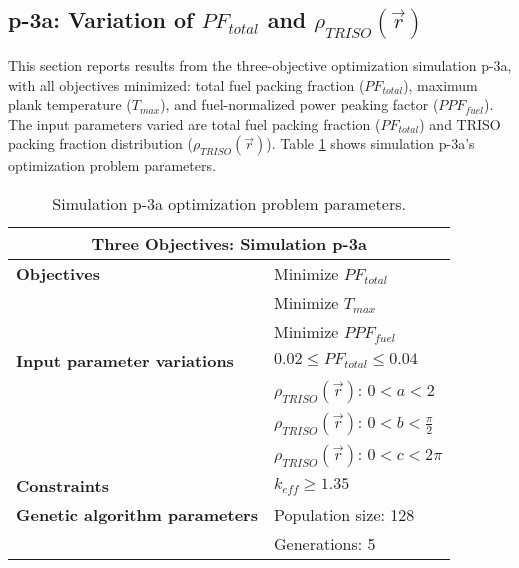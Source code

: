 \subsection{p-3a: Variation of $PF_{total}$ and $\rho_{TRISO}(\vec{r})$}
\label{sec:p-3a}
This section reports results from the three-objective optimization simulation p-3a, 
with all objectives minimized: total fuel packing fraction ($PF_{total}$), 
maximum plank temperature ($T_{max}$), and fuel-normalized power peaking factor 
($PPF_{fuel}$).  
The input parameters varied are total fuel packing fraction ($PF_{total}$) and 
TRISO packing fraction distribution ($\rho_{TRISO}(\vec{r})$). 
Table \ref{tab:simulationp3a} shows simulation p-3a's optimization problem parameters. 
\begin{table}[htbp!]
    \centering
    \onehalfspacing
    \caption{Simulation p-3a optimization problem parameters.}
	\label{tab:simulationp3a}
    \footnotesize
    \begin{tabular}{l|p{4cm}}
    \hline 
    \multicolumn{2}{c}{\textbf{Three Objectives: Simulation p-3a}} \\
    \hline 
    \textbf{Objectives} & Minimize $PF_{total}$ \\
    & Minimize $T_{max}$ \\
    & Minimize $PPF_{fuel}$ \\
    \hline 
    \textbf{Input parameter variations} & $0.02 \leq PF_{total} \leq 0.04$ \\
    & $\rho_{TRISO}(\vec{r})$: $0<a<2$ \\
    & $\rho_{TRISO}(\vec{r})$: $0<b<\frac{\pi}{2}$ \\
    & $\rho_{TRISO}(\vec{r})$: $0<c<2\pi$ \\
    \hline
    \textbf{Constraints} & $k_{eff} \geq 1.35$\\ 
    \hline 
    \textbf{Genetic algorithm parameters} & Population size: 128 \\
    & Generations: 5 \\
    \hline
    \end{tabular}
\end{table}


